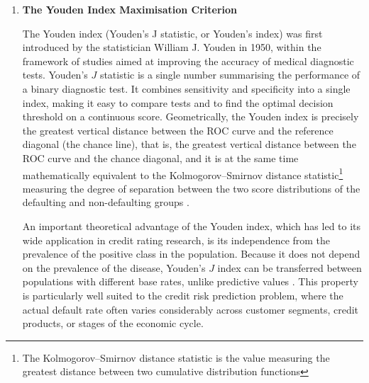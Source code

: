 \begin{enumerate}[label=\alph*)]
    \vspace{1em}
    \item \textbf{The Youden Index Maximisation Criterion}

    The Youden index (Youden's J statistic, or Youden's index) was first introduced by the statistician William J. Youden \cite{youden1950index} in 1950, within the framework of studies aimed at improving the accuracy of medical diagnostic tests. Youden's $J$ statistic is a single number summarising the performance of a binary diagnostic test. It combines sensitivity and specificity into a single index, making it easy to compare tests and to find the optimal decision threshold on a continuous score. Geometrically, the Youden index is precisely the greatest vertical distance between the ROC curve and the reference diagonal (the chance line), that is, the greatest vertical distance between the ROC curve and the chance diagonal, and it is at the same time mathematically equivalent to the Kolmogorov--Smirnov distance statistic\footnote{The Kolmogorov--Smirnov distance statistic is the value measuring the greatest distance between two cumulative distribution functions} measuring the degree of separation between the two score distributions of the defaulting and non-defaulting groups \cite{schisterman2005optimal}.

    \hspace{0.5cm} An important theoretical advantage of the Youden index, which has led to its wide application in credit rating research, is its independence from the prevalence of the positive class in the population. Because it does not depend on the prevalence of the disease, Youden's $J$ index can be transferred between populations with different base rates, unlike predictive values \cite{youden1950index}. This property is particularly well suited to the credit risk prediction problem, where the actual default rate often varies considerably across customer segments, credit products, or stages of the economic cycle.


\end{enumerate}
